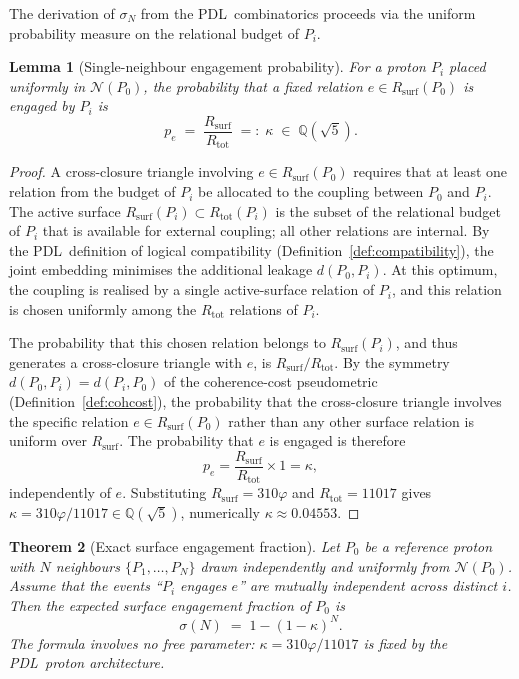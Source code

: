 \documentclass[11pt,a4paper]{article}
\newtheorem{theorem}{Theorem}[section]
\newtheorem{lemma}[theorem]{Lemma}
\theoremstyle{definition}
\newcommand{\PDL}{\textnormal{PDL}}
\newcommand{\Rsurf}{R_{\mathrm{surf}}}
\newcommand{\Rtot}{R_{\mathrm{tot}}}
\newcommand{\vp}{\varphi}
\newcommand{\kap}{\kappa}
\newcommand{\sig}{\sigma}
\begin{document}
The derivation of $\sig_N$ from the \PDL\ combinatorics proceeds via the uniform probability measure on the relational budget of $P_i$.

\begin{lemma}[Single-neighbour engagement probability]
\label{lem:single_p}
For a proton $P_i$ placed uniformly in $\mathcal{N}(P_0)$, the probability that a fixed relation $e \in \Rsurf(P_0)$ is engaged by $P_i$ is
\begin{equation}
  \label{eq:kap_def}
  p_e \;=\; \frac{\Rsurf}{\Rtot} \;=:\; \kap \;\in\; \mathbb{Q}(\sqrt{5}).
\end{equation}
\end{lemma}

\begin{proof}
A cross-closure triangle involving $e \in \Rsurf(P_0)$ requires that at least one relation from the budget of $P_i$ be allocated to the coupling between $P_0$ and $P_i$. The active surface $\Rsurf(P_i) \subset \Rtot(P_i)$ is the subset of the relational budget of $P_i$ that is available for external coupling; all other relations are internal. By the \PDL\ definition of logical compatibility (Definition~\ref{def:compatibility}), the joint embedding minimises the additional leakage $d(P_0,P_i)$. At this optimum, the coupling is realised by a single active-surface relation of $P_i$, and this relation is chosen uniformly among the $\Rtot$ relations of $P_i$.

The probability that this chosen relation belongs to $\Rsurf(P_i)$, and thus generates a cross-closure triangle with $e$, is $\Rsurf/\Rtot$. By the symmetry $d(P_0,P_i) = d(P_i,P_0)$ of the coherence-cost pseudometric (Definition~\ref{def:cohcost}), the probability that the cross-closure triangle involves the specific relation $e \in \Rsurf(P_0)$ rather than any other surface relation is uniform over $\Rsurf$. The probability that $e$ is engaged is therefore
\[
  p_e = \frac{\Rsurf}{\Rtot} \times 1 = \kap,
\]
independently of $e$. Substituting $\Rsurf = 310\vp$ and $\Rtot = 11017$ gives $\kap = 310\vp/11017 \in \mathbb{Q}(\sqrt{5})$, numerically $\kap \approx 0.04553$.
\end{proof}

\begin{theorem}[Exact surface engagement fraction]
\label{thm:sigma_exact}
Let $P_0$ be a reference proton with $N$ neighbours $\{P_1,\ldots,P_N\}$ drawn independently and uniformly from $\mathcal{N}(P_0)$. Assume that the events ``$P_i$ engages $e$'' are mutually independent across distinct $i$. Then the expected surface engagement fraction of $P_0$ is
\begin{equation}
  \label{eq:sigma_exact}
  \sig(N) \;=\; 1 - (1-\kap)^N.
\end{equation}
The formula involves no free parameter: $\kap = 310\vp/11017$ is fixed by the \PDL\ proton architecture.
\end{theorem}
\end{document}

